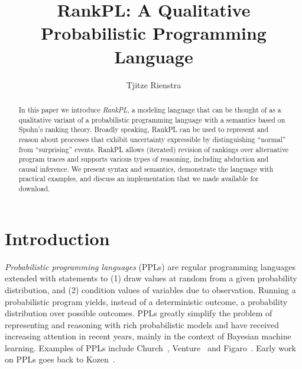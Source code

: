 \documentclass{llncs}
\begin{document}
\title{RankPL: A Qualitative Probabilistic Programming Language}

\author{Tjitze Rienstra}


\maketitle

\begin{abstract}
In this paper we introduce \emph{RankPL}, a modeling language
	that can be thought of as a qualitative variant of a probabilistic programming language
	with a semantics based on Spohn's ranking theory.
Broadly speaking, RankPL can be used to represent and reason about processes that exhibit 
	uncertainty expressible by distinguishing ``normal'' from ``surprising'' events.
RankPL allows (iterated) revision of rankings over alternative program traces and
	supports various types of reasoning, including abduction and causal inference.
We present syntax and semantics, 
	demonstrate the language with practical examples,
	and discuss an implementation that we made available for download.
\end{abstract}

\section{Introduction}

\emph{Probabilistic programming languages} (PPLs) are regular programming languages extended with statements to 
	(1) draw values at random from a given probability distribution, and 
	(2) condition values of variables due to observation.
Running a probabilistic program yields, instead of a deterministic outcome, a probability distribution over possible outcomes.
PPLs greatly simplify the problem of representing and reasoning with rich probabilistic models 
	and have received increasing attention in recent years, mainly in the context of Bayesian machine learning.
Examples of PPLs include Church~\cite{DBLP:conf/uai/GoodmanMRBT08}, 
	Venture~\cite{DBLP:journals/corr/MansinghkaSP14} and Figaro~\cite{pfeffer2009figaro}.
Early work on PPLs goes back to Kozen~\cite{DBLP:journals/jcss/Kozen81}.
\end{document}
